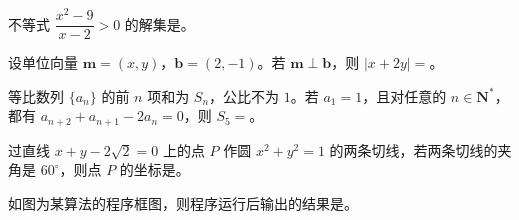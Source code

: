 \begin{question}
不等式 $\dfrac{x^2-9}{x-2}>0$ 的解集是\gkblank{}。

\end{question}
\begin{question}
设单位向量 $\boldsymbol m=(x,y)$，$\boldsymbol b=(2,-1)$。若 $\boldsymbol m\perp\boldsymbol b$，则 $|x+2y|=$\gkblank{}。

\end{question}
\begin{question}
等比数列 $\{a_n\}$ 的前 $n$ 项和为 $S_n$，公比不为 $1$。若 $a_1=1$，且对任意的 $n\in\mathbf N^*$，都有 $a_{n+2}+a_{n+1}-2a_n=0$，则 $S_5=$\gkblank{}。

\end{question}
\begin{question}
过直线 $x+y-2\sqrt2=0$ 上的点 $P$ 作圆 $x^2+y^2=1$ 的两条切线，若两条切线的夹角是 $60^\circ$，则点 $P$ 的坐标是\gkblank{}。

\Needspace{0.4\textheight}
\end{question}
\begin{question}
如图为某算法的程序框图，则程序运行后输出的结果是\gkblank{}。
\nopagebreak[4]
\begin{center}\end{center}
\nopagebreak[4]
\end{question}

